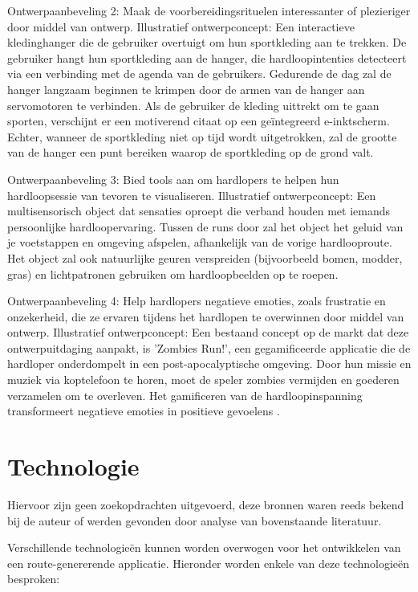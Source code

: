     Ontwerpaanbeveling 2: Maak de voorbereidingsrituelen interessanter of plezieriger door middel van ontwerp. 
    Illustratief ontwerpconcept: Een interactieve kledinghanger die de gebruiker overtuigt om hun sportkleding aan te trekken. 
    De gebruiker hangt hun sportkleding aan de hanger, die hardloopintenties detecteert via een verbinding met de agenda van de gebruikers. 
    Gedurende de dag zal de hanger langzaam beginnen te krimpen door de armen van de hanger aan servomotoren te verbinden. 
    Als de gebruiker de kleding uittrekt om te gaan sporten, verschijnt er een motiverend citaat op een geïntegreerd e-inktscherm. 
    Echter, wanneer de sportkleding niet op tijd wordt uitgetrokken, zal de grootte van de hanger een punt bereiken waarop de sportkleding op de grond valt.



    Ontwerpaanbeveling 3: Bied tools aan om hardlopers te helpen hun hardloopsessie van tevoren te visualiseren. 
    Illustratief ontwerpconcept: Een multisensorisch object dat sensaties oproept die verband houden met iemands persoonlijke hardloopervaring. 
    Tussen de runs door zal het object het geluid van je voetstappen en omgeving afspelen, afhankelijk van de vorige hardlooproute. 
    Het object zal ook natuurlijke geuren verspreiden (bijvoorbeeld bomen, modder, gras) en lichtpatronen gebruiken om hardloopbeelden op te roepen.


    Ontwerpaanbeveling 4: Help hardlopers negatieve emoties, zoals frustratie en onzekerheid, die ze ervaren tijdens het hardlopen te overwinnen 
    door middel van ontwerp. 
    Illustratief ontwerpconcept: Een bestaand concept op de markt dat deze ontwerpuitdaging aanpakt, is 'Zombies Run!', 
    een gegamificeerde applicatie die de hardloper onderdompelt in een post-apocalyptische omgeving. 
    Door hun missie en muziek via koptelefoon te horen, moet de speler zombies vermijden en goederen verzamelen om te overleven. 
    Het gamificeren van de hardloopinspanning transformeert negatieve emoties in positieve gevoelens \autocite{Menheere2020}.


    \section{Technologie}
    Hiervoor zijn geen zoekopdrachten uitgevoerd, deze bronnen waren reeds bekend bij de auteur of werden gevonden door analyse van bovenstaande literatuur.

    Verschillende technologieën kunnen worden overwogen voor het ontwikkelen van een route-genererende applicatie. Hieronder worden enkele van deze technologieën besproken:

